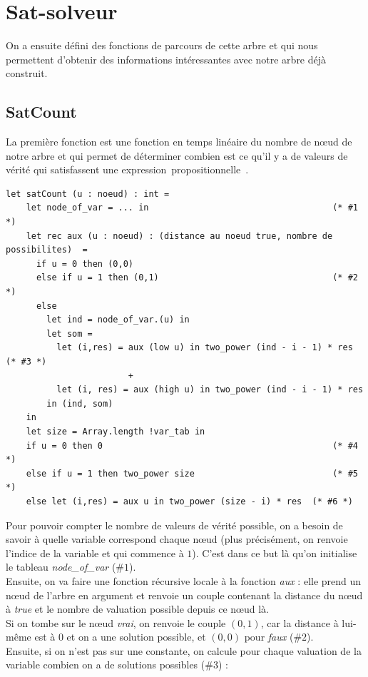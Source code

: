 \documentclass[a4paper, oneside]{report}
\newcommand{\expp}{expression~propositionnelle~}
\begin{document}
\section{Sat-solveur}
On a ensuite défini des fonctions de parcours de cette arbre et qui nous permettent d'obtenir des informations intéressantes avec notre arbre déjà construit.

\subsection{SatCount}
La première fonction est une fonction en temps linéaire du nombre de nœud de notre arbre et qui permet de déterminer combien est ce qu'il y a de valeurs de vérité qui satisfassent une \expp.
\begin{lstlisting}
let satCount (u : noeud) : int =
    let node_of_var = ... in									(* #1 *)
    let rec aux (u : noeud) : (distance au noeud true, nombre de possibilites)  = 
      if u = 0 then (0,0) 			
      else if u = 1 then (0,1) 									(* #2 *)
      else
        let ind = node_of_var.(u) in
        let som = 
          let (i,res) = aux (low u) in two_power (ind - i - 1) * res (* #3 *)
                        +
          let (i, res) = aux (high u) in two_power (ind - i - 1) * res
        in (ind, som)
    in
	let size = Array.length !var_tab in
    if u = 0 then 0												(* #4 *)
    else if u = 1 then two_power size							(* #5 *)
    else let (i,res) = aux u in two_power (size - i) * res	(* #6 *)
\end{lstlisting}

Pour pouvoir compter le nombre de valeurs de vérité possible, on a besoin de savoir à quelle variable correspond chaque nœud (plus précisément, on renvoie l'indice de la variable et qui commence à $1$). C'est dans ce but là qu'on initialise le tableau \textit{node\_of\_var} ($\#1$).\\
Ensuite, on va faire une fonction récursive locale à la fonction \textit{aux} : elle prend un nœud de l'arbre en argument et renvoie un couple contenant la distance du nœud à \textit{true} et le nombre de valuation possible depuis ce nœud là.\\
Si on tombe sur le nœud \textit{vrai}, on renvoie le couple $(0,1)$, car la distance à lui-même est à $0$ et on a une solution possible, et $(0,0)$ pour \textit{faux} ($\#2$).\\
Ensuite, si on n'est pas sur une constante, on calcule pour chaque valuation de la variable combien on a de solutions possibles ($\#3$) :
\end{document}
